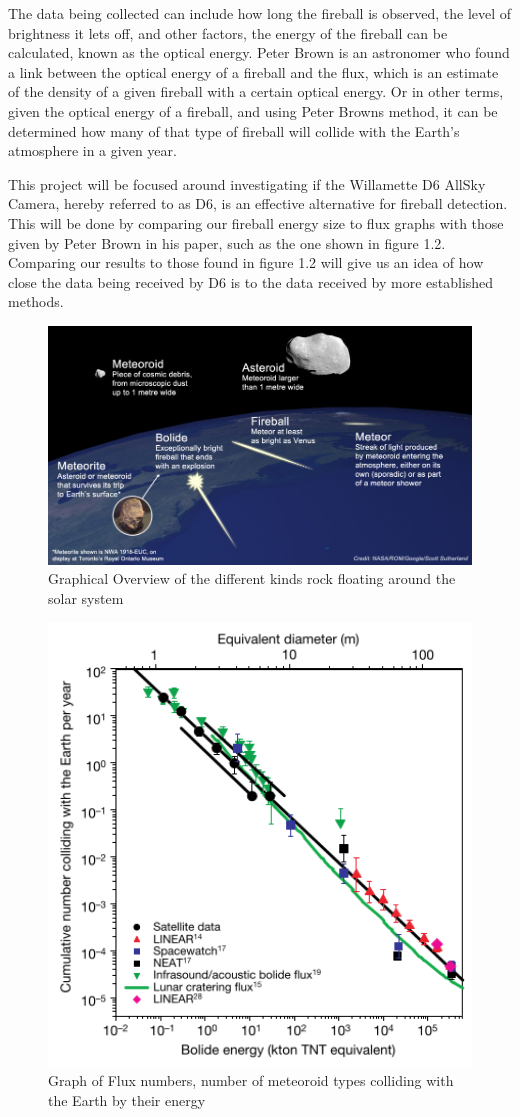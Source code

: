 The data being collected can include how long the fireball is observed, the level of brightness it lets off, and other factors, the energy of the fireball can be calculated, known as the optical energy. 
Peter Brown is an astronomer who found a link between the optical energy of a fireball and the flux, which is an estimate of the density of a given fireball with a certain optical energy. 
Or in other terms, given the optical energy of a fireball, and using Peter Browns method, it can be determined how many of that type of fireball will collide with the Earth's atmosphere in a given year.

This project will be focused around investigating if the Willamette D6 AllSky Camera, hereby referred to as D6, is an effective alternative for fireball detection. 
This will be done by comparing our fireball energy size to flux graphs with those given by Peter Brown in his paper, such as the one shown in figure 1.2. 
Comparing our results to those found in figure 1.2 will give us an idea of how close the data being received by D6 is to the data received by more established methods.




\begin{figure}
    \centering
    \includegraphics[width=12cm]{Meteor_comparison.png}
    \centering
    \caption{Graphical Overview of the different kinds rock floating around the solar system}
    \label{fig: 1.1}
\end{figure}

\begin{figure}
    \centering
    \includegraphics[width=12cm]{flux_brown.png}
    \centering
    \caption{Graph of Flux numbers, number of meteoroid types colliding with the Earth by their energy}
    \label{fig: 1.2}
\end{figure}
